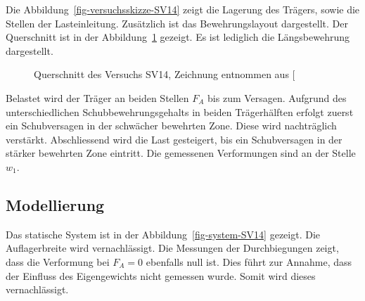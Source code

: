 \documentclass[
  11pt,
  letterpaper,
]{scrreprt}
\begin{document}
Die Abbildung~\ref{fig-versuchsskizze-SV14} zeigt die Lagerung des
Trägers, sowie die Stellen der Lasteinleitung. Zusätzlich ist das
Bewehrungslayout dargestellt. Der Querschnitt ist in der
Abbildung~\ref{fig-QS-SV14} gezeigt. Es ist lediglich die Längsbewehrung
dargestellt.

\begin{figure}[H]


\caption{\label{fig-QS-SV14}Querschnitt des Versuchs SV14, Zeichnung
entnommen aus {[}\citeproc{ref-gitz_ansatze_2024}{1}{]}}

\end{figure}%

Belastet wird der Träger an beiden Stellen \(F_A\) bis zum Versagen.
Aufgrund des unterschiedlichen Schubbewehrungsgehalts in beiden
Trägerhälften erfolgt zuerst ein Schubversagen in der schwächer
bewehrten Zone. Diese wird nachträglich verstärkt. Abschliessend wird
die Last gesteigert, bis ein Schubversagen in der stärker bewehrten Zone
eintritt. Die gemessenen Verformungen sind an der Stelle \(w_1\).

\subsection{Modellierung}\label{modellierung-1}

Das statische System ist in der Abbildung~\ref{fig-system-SV14} gezeigt.
Die Auflagerbreite wird vernachlässigt. Die Messungen der Durchbiegungen
zeigt, dass die Verformung bei \(F_A = 0\) ebenfalls null ist. Dies
führt zur Annahme, dass der Einfluss des Eigengewichts nicht gemessen
wurde. Somit wird dieses vernachlässigt.
\end{document}
